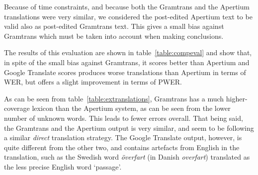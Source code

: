 \documentclass[11pt]{article}
\begin{document}
Because of time constraints, and because both the Gramtrans and the Apertium translations were very similar, 
we considered the post-edited Apertium text to be valid also as post-edited Gramtrans text.
This gives a small bias against Gramtrans which must be taken into account when making 
conclusions.

The results of this evaluation are shown in table~\ref{table:compeval} and show that, in spite 
of the small bias against Gramtrans, it scores better than Apertium and Google Translate 
scores produces worse translations than Apertium in terms of WER, but offers a slight improvement
in terms of PWER. 

As can be seen from table~\ref{table:extranslations}, Gramtrans has a much higher-coverage lexicon 
than the Apertium system, as can be seen from the lower number of unknown words. This leads to fewer errors overall. That being said, the Gramtrans
and the Apertium output is very similar, and seem to be following a similar \emph{direct} translation 
strategy. The Google Translate output, however, is quite different from the other two, and contains 
artefacts from English in the translation, such as the Swedish word \emph{överfart} (in Danish \emph{overfart}) translated as 
the less precise English word `passage'.
 




\end{document}
